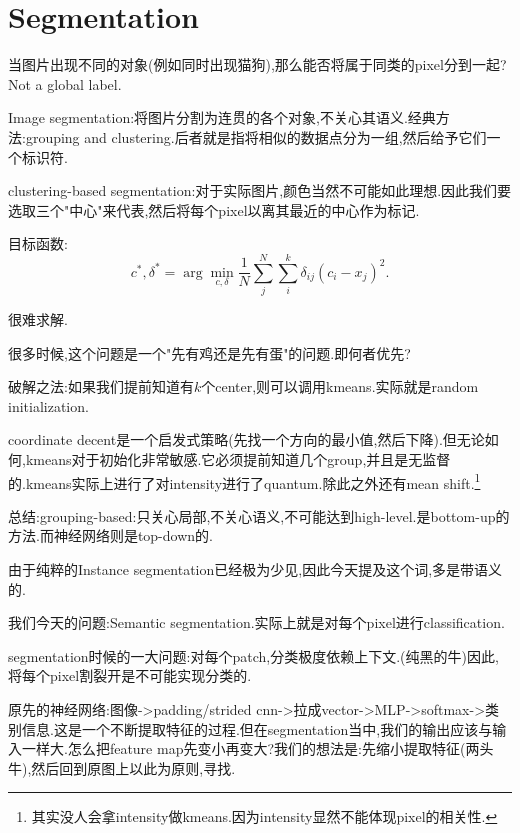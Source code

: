 \section{Segmentation}
当图片出现不同的对象(例如同时出现猫狗),那么能否将属于同类的pixel分到一起?Not a
global label.

Image segmentation:将图片分割为连贯的各个对象,不关心其语义.经典方法:grouping and clustering.后者就是指将相似的数据点分为一组,然后给予它们一个标识符.

clustering-based segmentation:对于实际图片,颜色当然不可能如此理想.因此我们要选取三个"中心"来代表,然后将每个pixel以离其最近的中心作为标记.

目标函数:
\begin{equation}
	c^*, \delta^* = \arg \min_{c, \delta} \frac{1}{N} \sum_{j}^{N} \sum_{i}^{k} \delta_{ij} (c_i - x_j)^2.
\end{equation}

很难求解.

很多时候,这个问题是一个"先有鸡还是先有蛋"的问题.即何者优先?

破解之法:如果我们提前知道有$k$个center,则可以调用kmeans.实际就是random initialization.

coordinate decent是一个启发式策略(先找一个方向的最小值,然后下降).但无论如何,kmeans对于初始化非常敏感.它必须提前知道几个group,并且是无监督的.kmeans实际上进行了对intensity进行了quantum.除此之外还有mean shift.\footnote{其实没人会拿intensity做kmeans.因为intensity显然不能体现pixel的相关性.}

总结:grouping-based:只关心局部,不关心语义,不可能达到high-level.是bottom-up的方法.而神经网络则是top-down的.

由于纯粹的Instance segmentation已经极为少见,因此今天提及这个词,多是带语义的.

我们今天的问题:Semantic segmentation.实际上就是对每个pixel进行classification.

segmentation时候的一大问题:对每个patch,分类极度依赖上下文.(纯黑的牛)因此,将每个pixel割裂开是不可能实现分类的.

原先的神经网络:图像->padding/strided cnn->拉成vector->MLP->softmax->类别信息.这是一个不断提取特征的过程.但在segmentation当中,我们的输出应该与输入一样大.怎么把feature map先变小再变大?我们的想法是:先缩小提取特征(两头牛),然后回到原图上以此为原则,寻找.

